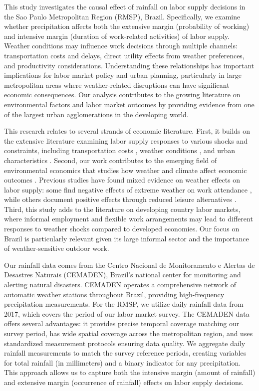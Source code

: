 This study investigates the causal effect of rainfall on labor supply decisions in the Sao Paulo Metropolitan Region (RMSP), Brazil. Specifically, we examine whether precipitation affects both the extensive margin (probability of working) and intensive margin (duration of work-related activities) of labor supply. Weather conditions may influence work decisions through multiple channels: transportation costs and delays, direct utility effects from weather preferences, and productivity considerations. Understanding these relationships has important implications for labor market policy and urban planning, particularly in large metropolitan areas where weather-related disruptions can have significant economic consequences. Our analysis contributes to the growing literature on environmental factors and labor market outcomes by providing evidence from one of the largest urban agglomerations in the developing world.

This research relates to several strands of economic literature. First, it builds on the extensive literature examining labor supply responses to various shocks and constraints, including transportation costs \citep{zenou2009urban}, weather conditions \citep{connolly2008here}, and urban characteristics \citep{moretti2011local}. Second, our work contributes to the emerging field of environmental economics that studies how weather and climate affect economic outcomes \citep{hsiang2016climate}. Previous studies have found mixed evidence on weather effects on labor supply: some find negative effects of extreme weather on work attendance \citep{lee2016temperature}, while others document positive effects through reduced leisure alternatives \citep{connolly2008here}. Third, this study adds to the literature on developing country labor markets, where informal employment and flexible work arrangements may lead to different responses to weather shocks compared to developed economies. Our focus on Brazil is particularly relevant given its large informal sector and the importance of weather-sensitive outdoor work.

Our rainfall data comes from the Centro Nacional de Monitoramento e Alertas de Desastres Naturais (CEMADEN), Brazil's national center for monitoring and alerting natural disasters. CEMADEN operates a comprehensive network of automatic weather stations throughout Brazil, providing high-frequency precipitation measurements. For the RMSP, we utilize daily rainfall data from 2017, which covers the period of our labor market survey. The CEMADEN data offers several advantages: it provides precise temporal coverage matching our survey period, has wide spatial coverage across the metropolitan region, and uses standardized measurement protocols ensuring data quality. We aggregate daily rainfall measurements to match the survey reference periods, creating variables for total rainfall (in millimeters) and a binary indicator for any precipitation. This approach allows us to capture both the intensive margin (amount of rainfall) and extensive margin (occurrence of rainfall) effects on labor supply decisions.

